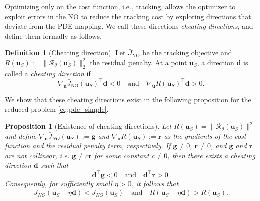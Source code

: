 \documentclass[final,1p,times]{elsarticle}
\theoremstyle{plain} %
\newtheorem{proposition}[theorem]{Proposition}
\theoremstyle{definition} %
\newtheorem{definition}[theorem]{Definition}
\theoremstyle{remark} %
\begin{document}
Optimizing only on the cost function, i.e., tracking, allows the optimizer to exploit errors in the NO to reduce the tracking cost by exploring directions that deviate from the PDE mapping. We call these directions \textit{cheating directions}, and define them formally as follows.

\begin{definition}[Cheating direction]\label{def:cheating_direction}
Let $\bar{J}_{\mathrm{NO}}$ be the tracking objective and
$R(\mathbf{u}_S):=\|\mathcal{R}_\theta(\mathbf{u}_S)\|_2^2$ the residual penalty.
At a point $\mathbf{u}_S$, a direction $\mathbf{d}$ is called a \emph{cheating direction} if
\[
\nabla_{\mathbf{u}}\bar{J}_{\mathrm{NO}}(\mathbf{u}_S)^\top \mathbf{d} < 0
\quad\text{and}\quad
\nabla_{\mathbf{u}}R(\mathbf{u}_S)^\top \mathbf{d}> 0.
\]
\end{definition}

We show that these cheating directions exist in the following proposition for the reduced problem \eqref{eq:pde_simple}.
\begin{proposition}[Existence of cheating directions]\label{prop:cheating_directions}
Let $R(\mathbf{u}_S)=\|\mathcal{R}_\theta(\mathbf{u}_S)\|^2$ and define $\nabla_\mathbf{u}\bar{J}_{NO}(\mathbf{u}_S):=\mathbf{g}$ and $\nabla_\mathbf{u}R(\mathbf{u}_S):=\mathbf{r}$ as the gradients of the cost function and the residual penalty term, respectively. If $\mathbf{g}\neq0$, $\mathbf{r}\neq0$, and $\mathbf{g}$ and $\mathbf{r}$ are not collinear, i.e. $\mathbf{g}\neq c\mathbf{r}$ for some constant $c\neq0$, then there exists a cheating direction $\mathbf{d}$ such that
\begin{equation}\label{eq:cheating_direction}
\mathbf{d}^\top \mathbf{g}<0 \quad \text{and}\quad \mathbf{d}^\top \mathbf{r}>0.
\end{equation}
Consequently, for sufficiently small $\eta>0$, it follows that
\begin{equation}\label{eq:cheating_direction_step}
\bar{J}_{NO}(\mathbf{u}_S+\eta \mathbf{d})<\bar{J}_{NO}(\mathbf{u}_S) \quad \text{and}\quad R(\mathbf{u}_S+\eta \mathbf{d})>R(\mathbf{u}_S).
\end{equation}
\end{proposition}
\end{document}

